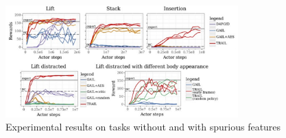 \begin{figure}[t]
    \centering
    \includegraphics[width=0.8\textwidth]{Figures/images/trail/trail_results.png}
    \caption{Experimental results on tasks without and with spurious features~\cite{zolna2021task_relevant_ail}}    
   \label{fig:trail_results}
\end{figure}

